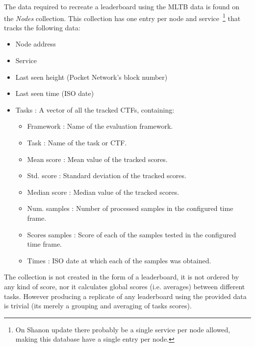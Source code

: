 The data required to recreate a leaderboard using the \gls{MLTB} data is found on the \emph{Nodes} collection. This collection has one entry per node and service~\footnote{On Shanon update there probably be a single service per node allowed, making this database have a single entry per node.} that tracks the following data:
\begin{itemize}
    \item Node address
    \item Service
    \item Last seen height (Pocket Network's block number)
    \item Last seen time (ISO date)
    \item Tasks : A vector of all the tracked \glspl{CTF}, containing:
    \begin{itemize}
        \item Framework : Name of the evaluation framework.
        \item Task : Name of the task or \gls{CTF}.
        \item Mean score : Mean value of the tracked scores.
        \item Std. score : Standard deviation of the tracked scores.
        \item Median score : Median value of the tracked scores.
        \item Num. samples : Number of processed samples in the configured time frame.
        \item Scores samples : Score of each of the samples tested in the configured time frame.
        \item Times : ISO date at which each of the samples was obtained.
    \end{itemize}
\end{itemize}

The collection is not created in the form of a leaderboard, it is not ordered by any kind of score, nor it calculates global scores (i.e. averages) between different tasks. However producing a replicate of any leaderboard using the provided data is trivial (its merely a grouping and averaging of tasks scores).

